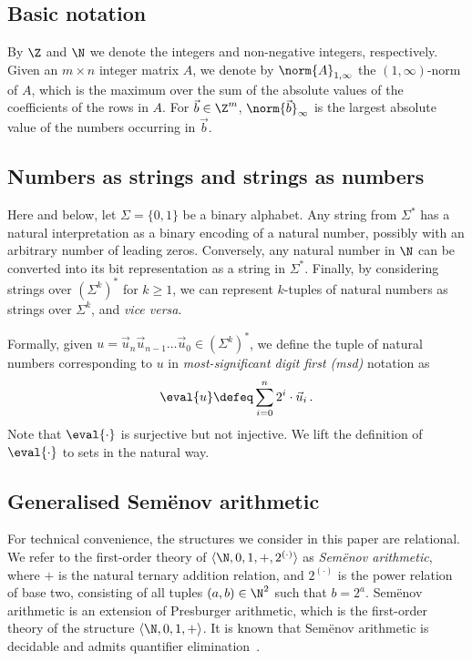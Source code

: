 


\subsection{Basic notation}
By $\Z$ and $\N$ we denote the integers and non-negative integers,
respectively. Given an $m\times n$ integer matrix $A$, we denote by
$\norm{A}_{1,\infty}$ the $(1,\infty)$-norm of $A$, which is the
maximum over the sum of the absolute values of the coefficients of the
rows in $A$. For $\vec b\in \Z^m$, $\norm{\vec b}_\infty$ is the
largest absolute value of the numbers occurring in $\vec b$.

\subsection{Numbers as strings and strings as numbers}
Here and below, let $\Sigma=\{0,1\}$ be a binary alphabet. Any string
from $\Sigma^*$ has a natural interpretation as a binary encoding of a
natural number, possibly with an arbitrary number of leading
zeros. Conversely, any natural number in $\N$ can be converted into
its bit representation as a string in $\Sigma^*$. Finally, by
considering strings over $(\Sigma^k)^*$ for $k\ge 1$, we can represent
$k$-tuples of natural numbers as strings over $\Sigma^k$, and
\emph{vice versa}.

Formally, given $u=\vec u_n \vec u_{n-1}\dots \vec u_0 \in
(\Sigma^k)^*$, we define the tuple of natural numbers corresponding to
$u$ in \emph{most-significant digit first (msd)} notation as
%
\[
\eval{u} \defeq \sum_{i=0}^n 2^i \cdot \vec u_i\,.
\]
%
Note that $\eval{\cdot}$ is surjective but not injective.%
We lift the definition of $\eval{\cdot}$
to sets in the natural way.


\subsection{Generalised Sem{\"e}nov arithmetic}
For technical convenience, the structures we consider in this paper
are relational. We refer to the first-order theory of $\langle
\N,0,1,+,2^{(\cdot)} \rangle$ as \emph{Sem{\"e}nov arithmetic}, where
$+$ is the natural ternary addition relation, and $2^{(\cdot)}$ is the
power relation of base two, consisting of all tuples $(a,b) \in \N^2$
such that $b=2^a$. Sem{\"e}nov arithmetic is an extension of
Presburger arithmetic, which is the first-order theory of the
structure $\langle \N,0,1,+ \rangle$. It is known that Sem{\"e}nov
arithmetic is decidable and admits quantifier
elimination~\cite{Sem80,CP86,BCM23}.


